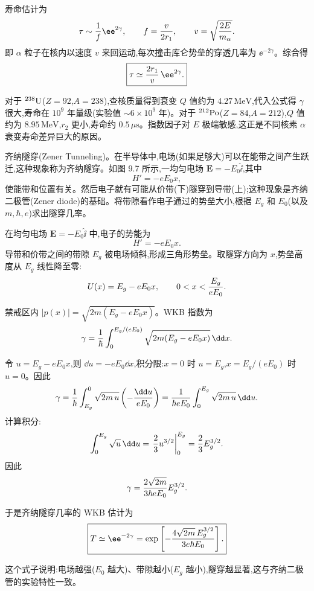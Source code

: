 \begin{question}
\begin{solution}
寿命估计为
\[
\tau\sim{1\over f}\ee^{2\gamma},
\qquad f={v\over2r_1},
\qquad v=\sqrt{2E\over m_\alpha}.
\]
即 $\alpha$ 粒子在核内以速度 $v$ 来回运动,每次撞击库仑势垒的穿透几率为 $\ee^{-2\gamma}$。综合得
\[
\boxed{\tau\simeq {2r_1\over v}\,\ee^{2\gamma}.}
\]

对于 $^{238}{\rm U}$($Z=92$,$A=238$),查核质量得到衰变 $Q$ 值约为 $4.27\,\mathrm{MeV}$,代入公式得 $\gamma$ 很大,寿命在 $10^9$ 年量级(实验值 $\sim6\times10^9$ 年)。对于 $^{212}{\rm Po}$($Z=84$,$A=212$),$Q$ 值约为 $8.95\,\mathrm{MeV}$,$r_2$ 更小,寿命约 $0.5\,\mu\mathrm{s}$。指数因子对 $E$ 极端敏感,这正是不同核素 $\alpha$ 衰变寿命差异巨大的原因。
\end{solution}
\end{question}

\begin{question}
齐纳隧穿(Zener Tunneling)。在半导体中,电场(如果足够大)可以在能带之间产生跃迁,这种现象称为齐纳隧穿。如图 9.7 所示,一均匀电场 $\mathbf E=-E_0\hat{\mathbf \ii}$,其中
\[
H'=-eE_0x,
\]
使能带和位置有关。然后电子就有可能从价带(下)隧穿到导带(上);这种现象是齐纳二极管(Zener diode)的基础。将带隙看作电子通过的势垒大小,根据 $E_g$ 和 $E_0$(以及 $m,\hbar,e$)求出隧穿几率。
\begin{solution}
在均匀电场 $\mathbf E=-E_0\hat{\mathbf \ii}$ 中,电子的势能为
\[
H'=-eE_0x.
\]
导带和价带之间的带隙 $E_g$ 被电场倾斜,形成三角形势垒。取隧穿方向为 $x$,势垒高度从 $E_g$ 线性降至零:
\[
U(x)=E_g-eE_0x,
\qquad 0<x<{E_g\over eE_0}.
\]

禁戒区内 $|p(x)|=\sqrt{2m(E_g-eE_0x)}$。WKB 指数为
\[
\gamma={1\over\hbar}\int_0^{E_g/(eE_0)}
\sqrt{2m(E_g-eE_0x)}\,\dd x.
\]

令 $u=E_g-eE_0x$,则 $\dd u=-eE_0\dd x$,积分限:$x=0$ 时 $u=E_g$,$x=E_g/(eE_0)$ 时 $u=0$。因此
\[
\gamma={1\over\hbar}\int_{E_g}^{0}\sqrt{2m\,u}\left(-{\dd u\over eE_0}\right)
={1\over\hbar eE_0}\int_0^{E_g}\sqrt{2m\,u}\,\dd u.
\]
计算积分:
\[
\int_0^{E_g}\sqrt{u}\,\dd u
=\left.{2\over3}u^{3/2}\right|_0^{E_g}={2\over3}E_g^{3/2}.
\]
因此
\[
\gamma={2\sqrt{2m}\over3\hbar eE_0}E_g^{3/2}.
\]

于是齐纳隧穿几率的 WKB 估计为
\[
\boxed{T\simeq \ee^{-2\gamma}
=\exp\left[-{4\sqrt{2m}\,E_g^{3/2}\over3e\hbar E_0}\right].}
\]

这个式子说明:电场越强($E_0$ 越大)、带隙越小($E_g$ 越小),隧穿越显著,这与齐纳二极管的实验特性一致。
\end{solution}
\end{question}

